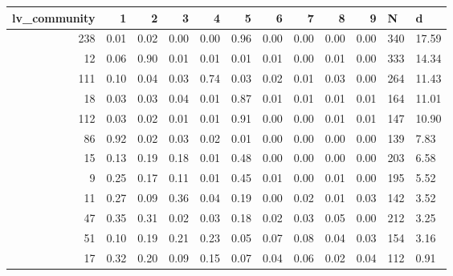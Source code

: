 \begin{tabular}{rrrrrrrrrrll}
\toprule
 lv\_community &    1 &    2 &    3 &    4 &    5 &    6 &    7 &    8 &    9 &   N &     d \\
\midrule
          238 & 0.01 & 0.02 & 0.00 & 0.00 & 0.96 & 0.00 & 0.00 & 0.00 & 0.00 & 340 & 17.59 \\
           12 & 0.06 & 0.90 & 0.01 & 0.01 & 0.01 & 0.01 & 0.00 & 0.01 & 0.00 & 333 & 14.34 \\
          111 & 0.10 & 0.04 & 0.03 & 0.74 & 0.03 & 0.02 & 0.01 & 0.03 & 0.00 & 264 & 11.43 \\
           18 & 0.03 & 0.03 & 0.04 & 0.01 & 0.87 & 0.01 & 0.01 & 0.01 & 0.01 & 164 & 11.01 \\
          112 & 0.03 & 0.02 & 0.01 & 0.01 & 0.91 & 0.00 & 0.00 & 0.01 & 0.01 & 147 & 10.90 \\
           86 & 0.92 & 0.02 & 0.03 & 0.02 & 0.01 & 0.00 & 0.00 & 0.00 & 0.00 & 139 &  7.83 \\
           15 & 0.13 & 0.19 & 0.18 & 0.01 & 0.48 & 0.00 & 0.00 & 0.00 & 0.00 & 203 &  6.58 \\
            9 & 0.25 & 0.17 & 0.11 & 0.01 & 0.45 & 0.01 & 0.00 & 0.01 & 0.00 & 195 &  5.52 \\
           11 & 0.27 & 0.09 & 0.36 & 0.04 & 0.19 & 0.00 & 0.02 & 0.01 & 0.03 & 142 &  3.52 \\
           47 & 0.35 & 0.31 & 0.02 & 0.03 & 0.18 & 0.02 & 0.03 & 0.05 & 0.00 & 212 &  3.25 \\
           51 & 0.10 & 0.19 & 0.21 & 0.23 & 0.05 & 0.07 & 0.08 & 0.04 & 0.03 & 154 &  3.16 \\
           17 & 0.32 & 0.20 & 0.09 & 0.15 & 0.07 & 0.04 & 0.06 & 0.02 & 0.04 & 112 &  0.91 \\
\bottomrule
\end{tabular}
